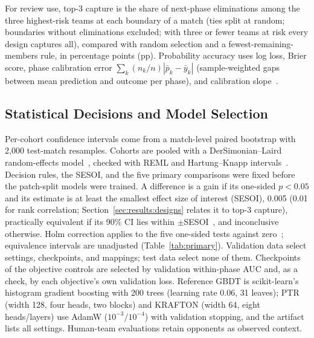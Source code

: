 \documentclass[sigconf,anonymous,nonacm]{acmart}
\begin{document}
For review use, top-3 capture is the share of next-phase eliminations among the three highest-risk teams at each boundary of a match (ties split at random; boundaries without eliminations excluded; with three or fewer teams at risk every design captures all), compared with random selection and a fewest-remaining-members rule, in percentage points (pp). Probability accuracy uses log loss, Brier score, phase calibration error $\sum_k(n_k/n)|\bar p_k-\bar y_k|$ (sample-weighted gaps between mean prediction and outcome per phase), and calibration slope~\cite{VanCalster16}.

\subsection{Statistical Decisions and Model Selection}
Per-cohort confidence intervals come from a match-level paired bootstrap with 2,000 test-match resamples.
Cohorts are pooled with a DerSimonian--Laird random-effects model~\cite{DerSimonian86}, checked with REML and Hartung--Knapp intervals~\cite{HartungKnapp01}.
Decision rules, the SESOI, and the five primary comparisons were fixed before the patch-split models were trained. A difference is a gain if its one-sided $p<0.05$ and its estimate is at least the smallest effect size of interest (SESOI), 0.005 (0.01 for rank correlation; Section~\ref{sec:results:designs} relates it to top-3 capture), practically equivalent if its 90\% CI lies within $\pm$SESOI~\cite{Schuirmann87}, and inconclusive otherwise.
Holm correction applies to the five one-sided tests against zero~\cite{Holm79}; equivalence intervals are unadjusted (Table~\ref{tab:primary}).
Validation data select settings, checkpoints, and mappings; test data select none of them. Checkpoints of the objective controls are selected by validation within-phase AUC and, as a check, by each objective's own validation loss. Reference GBDT is scikit-learn's histogram gradient boosting with 200 trees (learning rate 0.06, 31 leaves); PTR (width 128, four heads, two blocks) and KRAFTON (width 64, eight heads/layers) use AdamW ($10^{-3}$/$10^{-4}$) with validation stopping, and the artifact lists all settings. Human-team evaluations retain opponents as observed context.


\end{document}
